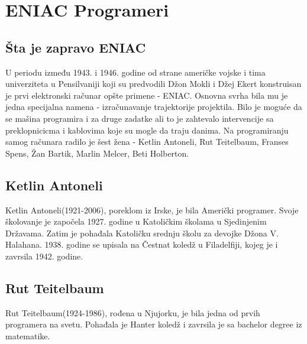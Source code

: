 \documentclass[a4paper,12pt]{article}
\begin{document}
\section{ENIAC Programeri}

\subsection{Šta je zapravo ENIAC}
\begin{flushleft}

U periodu između 1943. i 1946. godine od strane američke vojske i tima univerziteta u Pensilvaniji koji su predvodili Džon Mokli i Džej Ekert konstruisan je prvi elektronski računar opšte primene - ENIAC. Osnovna svrha bila mu je jedna specijalna namena - izračunavanje trajektorije projektila. Bilo je moguće da se mašina programira i za druge zadatke ali to je zahtevalo intervencije sa preklopnicicma i kablovima koje su mogle da traju danima. Na programiranju samog računara radilo je šest žena - Ketlin Antoneli, Rut Teitelbaum, Franses Spens, Žan Bartik, Marlin Melcer, Beti Holberton.

\end{flushleft}

\subsection{Ketlin Antoneli}
\begin{flushleft}

Ketlin Antoneli(1921-2006), poreklom iz Irske, je bila Američki programer. Svoje školovanje je započela 1927. godine u Katoličkim školama u Sjedinjenim Državama. Zatim je pohađala Katoličku srednju školu za devojke Džona V. Halahana. 1938. godine se upisala na Čestnat koledž u Filadelfiji, kojeg je i zavrsila 1942. godine.

\end{flushleft}

\subsection{Rut Teitelbaum}
\begin{flushleft}

Rut Teitelbaum(1924-1986), rođena u Njujorku, je bila jedna od prvih programera na svetu. Pohađala je Hanter koledž i zavrsila je sa bachelor degree iz matematike.

\end{flushleft}
\end{document}
